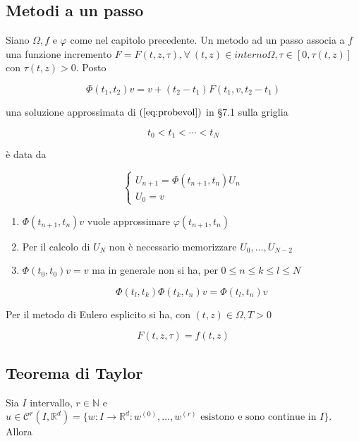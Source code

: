 \documentclass[hidelinks, 10pt]{report}
\begin{document}
\subsection{Metodi a un passo}

Siano $ \Omega, f $ e $ \varphi $ come nel capitolo precedente. Un metodo ad un passo associa a $ f $ una funzione incremento $ F = F(t, z, \tau), \forall\ (t, z) \in {interno}\Omega, \tau \in [0, \tau(t, z)] $ con $ \tau(t, z) > 0 $. Posto

\[ \Phi (t_{1}, t_{2}) v = v + (t_{2} - t_{1}) F(t_{1}, v, t_{2} - t_{1}) \]

una soluzione approssimata di $ (\ref{eq:probevol}) $ in \S 7.1 sulla griglia

\[ t_{0} < t_{1} < \dotsb < t_{N} \]

\`e data da 

\[
\begin{cases}
U_{n+1} = \Phi(t_{n + 1}, t_{n}) U_{n} \\
U_{0} = v
\end{cases}
\]

\begin{oss}
\noindent
\begin{enumerate}
\item $ \Phi(t_{n+1}, t_{n}) v $ vuole approssimare $ \varphi(t_{n + 1}, t_{n}) $
\item Per il calcolo di $ U_{N} $ non \`e necessario memorizzare $ U_{0}, \dotsc, U_{N - 2} $
\item $ \Phi (t_{0}, t_{0}) v = v $ ma in generale non si ha, per $ 0 \le n \le k \le l \le N $

\[ \Phi(t_{l}, t_{k}) \Phi(t_{k}, t_{n}) v  = \Phi(t_{l}, t_{n}) v \]
\end{enumerate}
\end{oss}

\begin{es}
Per il metodo di Eulero esplicito si ha, con $ (t, z) \in \Omega, T > 0 $

\[ F(t, z, \tau) = f(t, z) \]
\end{es}

\subsection{Teorema di Taylor}

Sia $ I $ intervallo, $ r \in \mathbb{N} $ e $ u \in \mathcal{C}^{r} (I, \mathbb{R}^{d}) = \{ w : I \to \mathbb{R}^{d} : w^{(0)}, \dotsc, w^{(r)} \text{ esistono e sono continue in } I \} $. Allora
\end{document}
